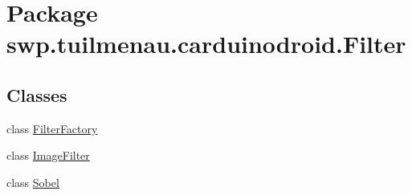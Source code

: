 \hypertarget{namespaceswp_1_1tuilmenau_1_1carduinodroid_1_1_filter}{}\section{Package swp.\+tuilmenau.\+carduinodroid.\+Filter}
\label{namespaceswp_1_1tuilmenau_1_1carduinodroid_1_1_filter}
\subsection*{Classes}
\begin{DoxyCompactItemize}
\item 
class \hyperlink{classswp_1_1tuilmenau_1_1carduinodroid_1_1_filter_1_1_filter_factory}{Filter\+Factory}
\item 
class \hyperlink{classswp_1_1tuilmenau_1_1carduinodroid_1_1_filter_1_1_image_filter}{Image\+Filter}
\item 
class \hyperlink{classswp_1_1tuilmenau_1_1carduinodroid_1_1_filter_1_1_sobel}{Sobel}
\end{DoxyCompactItemize}
